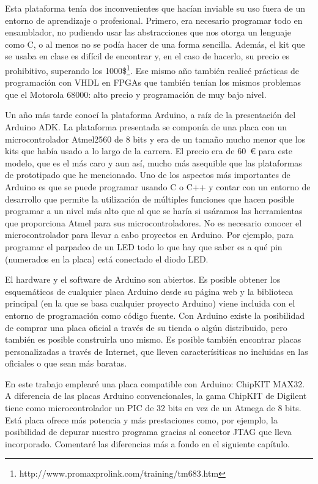 Esta plataforma tenía dos inconvenientes que hacían inviable su uso fuera de un entorno de aprendizaje o profesional.  Primero, era necesario programar todo en ensamblador, no pudiendo usar las abstracciones que nos otorga un lenguaje como C, o al menos no se podía hacer de una forma sencilla.  Además, el kit que se usaba en clase es difícil de encontrar y, en el caso de hacerlo, su precio es prohibitivo, superando los 1000\$\footnote{http://www.promaxprolink.com/training/tm683.htm}.  Ese mismo año también realicé prácticas de programación con VHDL en FPGAs que también tenían los mismos problemas que el Motorola 68000: alto precio y programación de muy bajo nivel.

Un año más tarde conocí la plataforma Arduino, a raíz de la presentación del Arduino ADK. La plataforma presentada se componía de una placa con un microcontrolador Atmel2560 de 8 bits y era de un tamaño mucho menor que los kits que había usado a lo largo de la carrera.  El precio era de 60~\euro{} para este modelo, que es el más caro y aun así, mucho más asequible que las plataformas de prototipado que he mencionado.  
Uno de los aspectos más importantes de Arduino es que se puede programar usando C o C++ y contar con un entorno de desarrollo que permite la utilización de múltiples funciones que hacen posible programar a un nivel más alto que al que se haría si usáramos las herramientas que proporciona Atmel para sus microcontroladores.  No es necesario conocer el microcontrolador para llevar a cabo proyectos en Arduino.  Por ejemplo, para programar el parpadeo de un LED todo lo que hay que saber es a qué pin (numerados en la placa) está conectado el diodo LED.

El hardware y el software de Arduino son abiertos.  Es posible obtener los esquemáticos de cualquier placa Arduino desde su página web y la biblioteca principal (en la que se basa cualquier proyecto Arduino) viene incluida con el entorno de programación como código fuente.  Con Arduino existe la posibilidad de comprar una placa oficial a través de su tienda o algún distribuido, pero también es posible construirla uno mismo.  Es posible también encontrar placas personalizadas a través de Internet, que lleven caracterísiticas no incluidas en las oficiales o que sean más baratas.

En este trabajo emplearé una placa compatible con Arduino: ChipKIT MAX32.  A diferencia de las placas Arduino convencionales, la gama ChipKIT de Digilent tiene como microcontrolador un PIC de 32 bits en vez de un Atmega de 8 bits.  Está placa ofrece más potencia y más prestaciones como, por ejemplo, la posibilidad de depurar nuestro programa gracias al conector JTAG que lleva incorporado. Comentaré las diferencias más a fondo en el siguiente capítulo.

